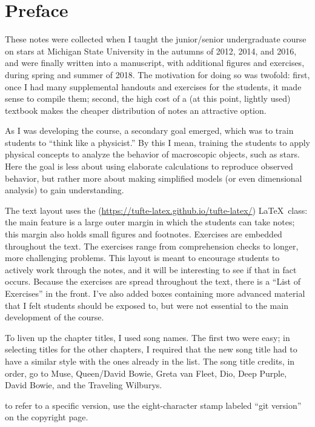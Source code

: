 
\section*{Preface}
These notes were collected when I taught the junior/senior undergraduate course on stars at Michigan State University in the autumns of 2012, 2014, and 2016, and were finally written into a manuscript, with additional figures and exercises, during spring and summer of 2018. The motivation for doing so was twofold: first, once I had many supplemental handouts and exercises for the students, it made sense to compile them; second, the high cost of a (at this point, lightly used) textbook makes the cheaper distribution of notes an attractive option.

As I was developing the course, a secondary goal emerged, which was to train students to ``think like a physicist.'' By this I mean, training the students to apply physical concepts to analyze the behavior of macroscopic objects, such as stars. Here the goal is less about using elaborate calculations to reproduce observed behavior, but rather more about making simplified models (or even dimensional analysis) to gain understanding.

The text layout uses the  (\url{https://tufte-latex.github.io/tufte-latex/}) \LaTeX\ class: the main feature is a large outer margin in which the students can take notes; this margin also holds small figures and footnotes. Exercises are embedded throughout the text. The exercises range from comprehension checks to longer, more challenging problems. This layout is meant to encourage students to actively work through the notes, and it will be interesting to see if that in fact occurs. Because the exercises are spread throughout the text, there is a ``List of Exercises'' in the front. I've also added boxes containing more advanced material that I felt students should be exposed to, but were not essential to the main development of the course. 

To liven up the chapter titles, I used song names. The first two were easy; in selecting titles for the other chapters, I required that the new song title had to have a similar style with the ones already in the list. The song title credits, in order, go to Muse, Queen/David Bowie, Greta van Fleet, Dio, Deep Purple, David Bowie, and the Traveling Wilburys.

 to refer to a specific version, use the eight-character stamp labeled ``git version'' on the copyright page.
